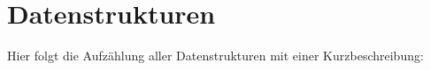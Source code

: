 \section{Datenstrukturen}
Hier folgt die Aufzählung aller Datenstrukturen mit einer Kurzbeschreibung\+:\begin{DoxyCompactList}
\item{}
\end{DoxyCompactList}
